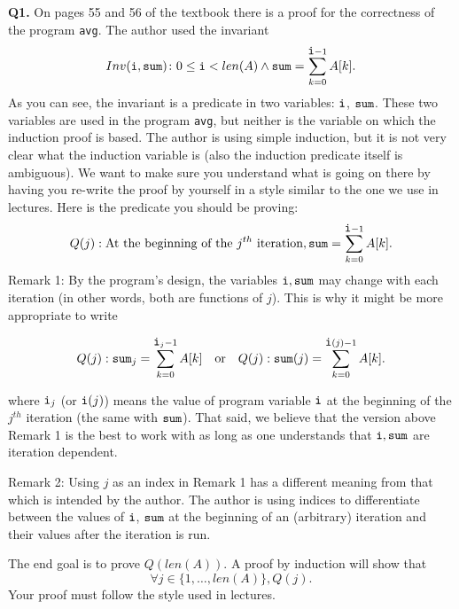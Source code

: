 \documentclass[11pt]{article}
\begin{document}
    \textbf{Q1.} On pages 55 and 56 of the textbook there is a proof for the correctness of the program \verb|avg|. The author used the invariant $$Inv(\verb|i|,\verb|sum|)\colon 0\leq \verb|i| < len(A) \wedge \verb|sum|=\sum_{k=0}^{\verb|i|-1}A[k].$$
    As you can see, the invariant is a predicate in two variables: $\verb|i|$, $\verb|sum|$. These two variables are used in the program \verb|avg|, but neither is the variable on which the induction proof is based.
    The author is using simple induction, but it is not very clear what the induction variable is (also the induction predicate itself is ambiguous). We want to make sure you understand what is going on there by having you re-write the proof by yourself in a style similar to the one we use in lectures. Here is the predicate
    you should be proving:
    $$Q(j): \text{At the beginning of the } j^{th} \text{ iteration}, \verb|sum|=\sum_{k=0}^{\verb|i|-1}A[k].$$
    Remark 1: By the program's design, the variables $\verb|i|,\verb|sum|$ may change with each iteration (in other words, both are functions of $j$). This is why it might be more appropriate to write
    
    $$Q(j): \verb|sum|_j=\sum_{k=0}^{\verb|i|_j-1}A[k] \quad \text{or} \quad Q(j): \verb|sum|(j)=\sum_{k=0}^{\verb|i|(j)-1}A[k].$$

    where $\verb|i|_j$ (or $\verb|i|(j)$) means the value of program variable $\verb|i|$ at the beginning of the $j^{th}$ iteration (the same with $\verb|sum|$).
    That said, we believe that the version above Remark 1 is the best to work with as long as one understands that $\verb|i|,\verb|sum|$ are iteration dependent.

    Remark 2: Using $j$ as an index in Remark 1 has a different meaning from that which is intended by the author. The author is using indices to differentiate between the values of $\verb|i|$, $\verb|sum|$ at the beginning of an (arbitrary) iteration and
    their values after the iteration is run.
    \medskip
    
    The end goal is to prove $Q(len(A))$. A proof by induction will show that $$\forall
    j\in\{1,\ldots,len(A)\}, Q(j).$$ Your proof must follow the style used in lectures.
\end{document}
